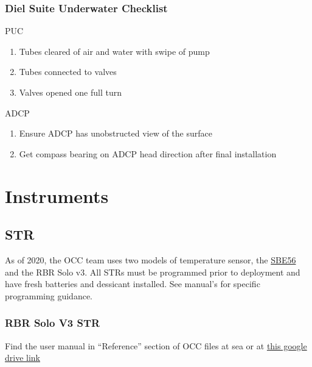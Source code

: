 \documentclass[]{book}
\providecommand{\tightlist}{%
  \setlength{\itemsep}{0pt}\setlength{\parskip}{0pt}}
\begin{document}
\hypertarget{diel-suite-underwater-checklist}{%
\section{Diel Suite Underwater Checklist}\label{diel-suite-underwater-checklist}}

PUC

\begin{enumerate}
\def\labelenumi{\arabic{enumi}.}
\tightlist
\item
  Tubes cleared of air and water with swipe of pump
\item
  Tubes connected to valves
\item
  Valves opened one full turn
\end{enumerate}

ADCP

\begin{enumerate}
\def\labelenumi{\arabic{enumi}.}
\tightlist
\item
  Ensure ADCP has unobstructed view of the surface
\item
  Get compass bearing on ADCP head direction after final installation
\end{enumerate}

\hypertarget{part-instruments}{%
\part*{Instruments}\label{part-instruments}}

\hypertarget{str}{%
\chapter{STR}\label{str}}

As of 2020, the OCC team uses two models of temperature sensor, the \protect\hyperlink{sbe56}{SBE56} and the RBR Solo v3. All STRs must be programmed prior to deployment and have fresh batteries and dessicant installed. See manual's for specific programming guidance.

\hypertarget{rbr-solo-v3-str}{%
\section{RBR Solo V3 STR}\label{rbr-solo-v3-str}}

Find the user manual in ``Reference'' section of OCC files at sea or at \href{https://drive.google.com/drive/folders/1U-g1gTLOArcf7o5yXx-76z2HU-ha1qCJ}{this google drive link}
\end{document}
